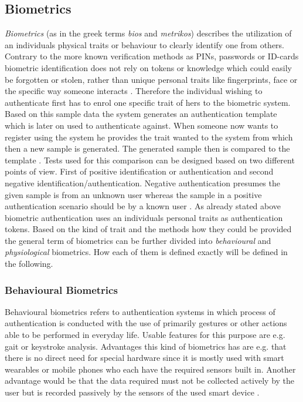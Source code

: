 \subsection{Biometrics}
\textit{Biometrics} (as in the greek terms \textit{bios} and \textit{metrikos}) describes the utilization of an individuals physical traits or behaviour to clearly identify one from others. Contrary to the more known verification methods as PINs, passwords or ID-cards biometric identification does not rely on tokens or knowledge which could easily be forgotten or stolen, rather than unique personal traits like fingerprints, face or the specific way someone interacts \cite[chpt. 1.1]{jain2007handbook}\cite{delac2004survey}.
Therefore the individual wishing to authenticate first has to enrol one specific trait of hers to the biometric system. Based on this sample data the system generates an authentication template which is later on used to authenticate against. 
When someone now wants to register using the system he provides the trait wanted to the system from which then a new sample is generated. The generated sample then is compared to the template \cite{alsaadi2015physiological}.
Tests used for this comparison can be designed based on two different points of view. First of positive identification or authentication and second negative identification/authentication.
Negative authentication presumes the given sample is from an unknown user whereas the sample in a positive authentication scenario should be by a known user \cite{wayman2005introduction}.
As already stated above biometric authentication uses an individuals personal traits as authentication tokens. Based on the kind of trait and the methods how they could be provided the general term of biometrics can be further divided into \textit{behavioural} and \textit{physiological} biometrics. How each of them is defined exactly will be defined in the following.
\subsubsection{Behavioural Biometrics} Behavioural biometrics refers to authentication systems in which process of authentication is conducted with the use of primarily gestures or other actions able to be performed in everyday life.
Usable features for this purpose are e.g. gait or keystroke analysis. Advantages this kind of biometrics has are e.g. that there is no direct need for special hardware since it is mostly used with smart wearables or mobile phones who each have the required sensors built in.
Another advantage would be that the data required must not be collected actively by the user but is recorded passively by the sensors of the used smart device \cite{yampolskiy2008behavioural}.
